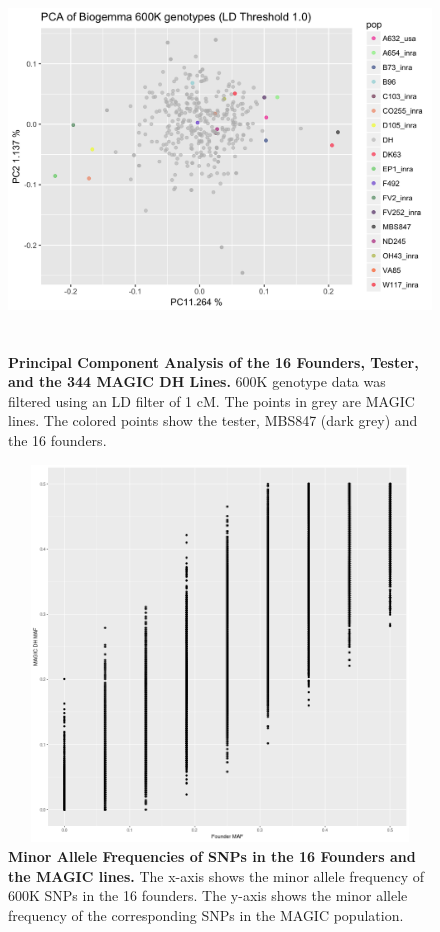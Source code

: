 \documentclass[9pt,twocolumn,twoside]{gsag3jnl}
\begin{document}
\begin{figure}[ht]
\centering
\includegraphics[width=16cm,height=10cm]{figures/PCA_LD1.png}
\caption{\textbf{Principal Component Analysis of the 16 Founders, Tester, and the 344 MAGIC DH Lines.} 600K genotype data was filtered using an LD filter of 1 cM. The points in grey are MAGIC lines. The colored points show the tester, MBS847 (dark grey) and the 16 founders.}
\label{fig:supfigure7}
\end{figure}

\begin{figure}[ht]
\centering
\includegraphics[width=16cm,height=10cm]{figures/Biogemma_Founder_to_DH_MAF.png}
\caption{\textbf{Minor Allele Frequencies of SNPs in the 16 Founders and the MAGIC lines.} The x-axis shows the minor allele frequency of 600K SNPs in the 16 founders. The y-axis shows the minor allele frequency of the corresponding SNPs in the MAGIC population.}
\label{fig:supfigure8}
\end{figure}
\end{document}
